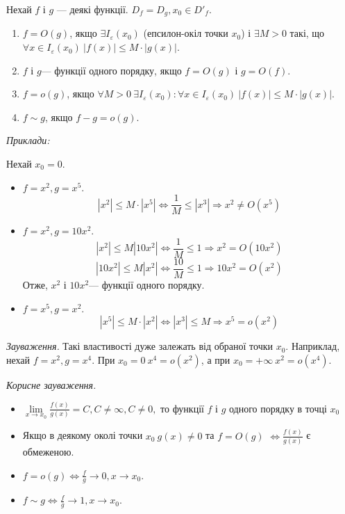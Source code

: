 \documentclass[12pt]{report}
\begin{document}
\vspace{5mm}

Нехай $f$ і $g$ --- деякі функції. $D_f = D_g, x_0 \in D'_f$.

\begin{enumerate}
    \item $f = O(g)$, якщо $\exists I_{\varepsilon}(x_0)$ (епсилон-окіл точки $x_0$) і $\exists M > 0$ такі, що $\forall x \in I_{\varepsilon}(x_0) \ |f(x)| \leq M \cdot |g(x)|$.
    \item $f$ і $g$--- функції одного порядку, якщо $f = O(g)$ і $g = O(f)$.
    \item $f = o(g)$, якщо $\forall M > 0 \ \exists I_{\varepsilon}(x_0) : \forall x \in I_{\varepsilon}(x_0) \ |f(x)| \leq M \cdot |g(x)|$.
    \item $f \sim g$, якщо $f - g = o(g)$.
\end{enumerate}

\textit{Приклади:}

Нехай $x_0 = 0$.

\begin{itemize}
    \item $f = x^2, g = x^5$. 
    $$|x^2| \leq M\cdot |x^5| \Longleftrightarrow \frac{1}{M} \leq |x^3| \Longrightarrow x^2 \neq O(x^5)$$
    \item $f = x^2, g = 10x^2$.
    $$|x^2| \leq M|10x^2| \Longleftrightarrow \frac{1}{M} \leq 1 \Longrightarrow x^2 = O(10x^2)$$
    $$|10x^2| \leq M|x^2| \Longleftrightarrow \frac{10}{M} \leq 1 \Longrightarrow 10x^2 = O(x^2)$$
    Отже, $x^2$ і $10x^2$--- функції одного порядку.
    \item $f = x^5, g = x^2$.
    $$|x^5| \leq M\cdot |x^2| \Longleftrightarrow |x^3|\leq M \Longrightarrow x^5 = o(x^2)$$
\end{itemize}

\textit{Зауваження.} Такі властивості дуже залежать від обраної точки $x_0$. Наприклад, нехай $f = x^2, g = x^4$. При $x_0 = 0 \ x^4 = o(x^2)$, а при $x_0 = +\infty \ x^2 = o(x^4)$.

\vspace{5mm}

\textit{Корисне зауваження.} 
\begin{itemize}
    \item $\lim\limits_{x \to x_0}\frac{f(x)}{g(x)} = C, C \neq \infty, C \neq 0, \textrm{ то функції $f$ і $g$ одного порядку в точці $x_0$}$
    \item Якщо в деякому околі точки $x_0 \ g(x) \neq 0$ та $f = O(g)$ $\Longleftrightarrow \frac{f(x)}{g(x)}$ є обмеженою.
    \item $f = o(g) \Longleftrightarrow \frac{f}{g} \to 0, x \to x_0$.
    \item $f \sim g \Longleftrightarrow \frac{f}{g} \to 1, x \to x_0$.
\end{itemize}
\end{document}
